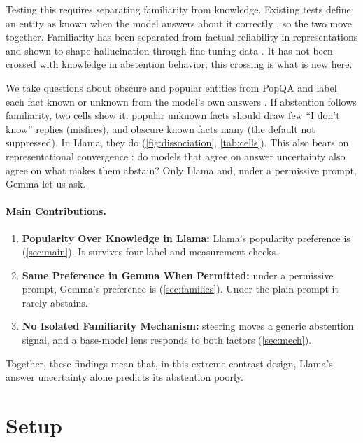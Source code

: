 \documentclass{article}
\newcommand{\idk}{``I don't know''}
\begin{document}
Testing this requires separating familiarity from knowledge. Existing tests define an entity as known when the model answers about it correctly \citep{ferrando2025iknow}, so the two move together. Familiarity has been separated from factual reliability in representations \citep{brzezinka2026bielik} and shown to shape hallucination through fine-tuning data \citep{kang2025unfamiliar}. It has not been crossed with knowledge in abstention behavior; this crossing is what is new here.

We take questions about obscure and popular entities from PopQA \citep{mallen2023popqa} and label each fact known or unknown from the model's own answers \citep{gekhman2024slick}. If abstention follows familiarity, two cells show it: popular unknown facts should draw few \idk{} replies (misfires), and obscure known facts many (the default not suppressed). In Llama, they do (\cref{fig:dissociation}, \cref{tab:cells}). This also bears on representational convergence \citep{huh2024platonic}: do models that agree on answer uncertainty also agree on what makes them abstain? Only Llama and, under a permissive prompt, Gemma let us ask.

\paragraph{Main Contributions.}
\begin{enumerate}[leftmargin=1.4em,itemsep=1pt,topsep=2pt,parsep=0pt]
\item \textbf{Popularity Over Knowledge in Llama:} Llama's popularity preference is \hmLlamaDiff{} \hmLlamaDiffCI{} (\cref{sec:main}). It survives four label and measurement checks.
\item \textbf{Same Preference in Gemma When Permitted:} under a permissive prompt, Gemma's preference is \pmGemmaDiff{} \pmGemmaDiffCI{} (\cref{sec:families}). Under the plain prompt it rarely abstains.
\item \textbf{No Isolated Familiarity Mechanism:} steering moves a generic abstention signal, and a base-model lens responds to both factors (\cref{sec:mech}).
\end{enumerate}
Together, these findings mean that, in this extreme-contrast design, Llama's answer uncertainty alone predicts its abstention poorly.

\section{Setup}
\label{sec:setup}
\end{document}
